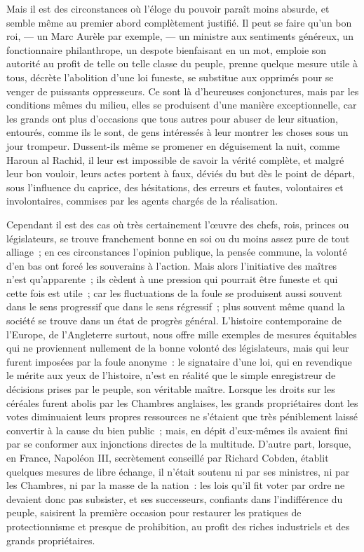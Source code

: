 \documentclass[french,twoside]{book} %
\begin{document}
Mais il est des circonstances où l’éloge  du pouvoir paraît moins absurde, et semble même au premier abord complètement justifié. Il peut se faire qu’un bon roi, — un Marc Aurèle par exemple, — un ministre aux sentiments généreux, un fonctionnaire philanthrope, un despote bienfaisant en un mot, emploie son autorité au profit de telle ou telle classe du peuple, prenne quelque mesure utile à tous, décrète l’abolition d’une loi funeste, se substitue aux opprimés pour se venger de puissants oppresseurs. Ce sont là d’heureuses conjonctures, mais par les conditions mêmes du milieu, elles se produisent d’une manière exceptionnelle, car les grands ont plus d’occasions que tous autres pour abuser de leur situation, entourés, comme ils le sont, de gens intéressés à  leur montrer les choses sous un jour trompeur. Dussent-ils même se promener en déguisement la nuit, comme Haroun al Rachid, il leur est impossible de savoir la vérité complète, et malgré leur bon vouloir, leurs actes portent à faux, déviés du but dès le point de départ, sous l’influence du caprice, des hésitations, des erreurs et fautes, volontaires et involontaires, commises par les agents chargés de la réalisation.\par
Cependant il est des cas où très certainement l’œuvre des chefs, rois, princes ou législateurs, se trouve franchement bonne en soi ou du moins assez pure de tout alliage ; en ces circonstances l’opinion publique, la pensée commune, la volonté d’en bas ont forcé les souverains à l’action. Mais alors l’initiative  des maîtres n’est qu’apparente ; ils cèdent à une pression qui pourrait être funeste et qui cette fois est utile ; car les fluctuations de la foule se produisent aussi souvent dans le sens progressif que dans le sens régressif ; plus souvent même quand la société se trouve dans un état de progrès général. L’histoire contemporaine de l’Europe, de l’Angleterre surtout, nous offre mille exemples de mesures équitables qui ne proviennent nullement de la bonne volonté des législateurs, mais qui leur furent imposées par la foule anonyme : le signataire d’une loi, qui en revendique le mérite aux yeux de l’histoire, n’est en réalité que le simple enregistreur de décisions prises par le peuple, son véritable maître. Lorsque les droits sur les céréales furent  abolis par les Chambres anglaises, les grands propriétaires dont les votes diminuaient leurs propres ressources ne s’étaient que très péniblement laissé convertir à la cause du bien public ; mais, en dépit d’eux-mêmes ils avaient fini par se conformer aux injonctions directes de la multitude. D’autre part, lorsque, en France, Napoléon III, secrètement conseillé par Richard Cobden, établit quelques mesures de libre échange, il n’était soutenu ni par ses ministres, ni par les Chambres, ni par la masse de la nation : les lois qu’il fit voter par ordre ne devaient donc pas subsister, et ses successeurs, confiants dans l’indifférence du peuple, saisirent la première occasion pour restaurer les pratiques de protectionnisme et presque de prohibition, au profit des  riches industriels et des grands propriétaires.\par
\end{document}
